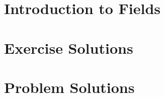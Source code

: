
\usepackage{xr}

\newcommand{\version}{0.1}
\newcommand{\volumenumber}{3}
\newcommand{\volumename}{Fields}
\newcommand{\volumeimage}{cover/Regular Heptagon.png}

\linespread{1.05}



\newcommand{\quotepagetext}{
    I became convinced that studying the algebraic relationship of numbers is most conveniently based on a concept that is directly connected with the simplest arithmetic properties. I had originally used the term ``rational domain'', which I later changed to ``field''.
}
\newcommand{\quotepageattribution}{Richard Dedekind, 1871}
\newcommand{\quotepagecitation}{\cite[p.~66]{kleiner_2007}}

\newcommand{\prefacevolumetext}{
    We cover field theory essentials in Volume III. %
}

\newcommand{\interdependencenotes}{
    \begin{itemize}
        \item Number 1
        \item number 2
        \item 3
    \end{itemize}
}


\frontmatterpages  %

\chapter{Introduction to Fields}

\appendix
\chapter{Exercise Solutions}

\chapter{Problem Solutions}

